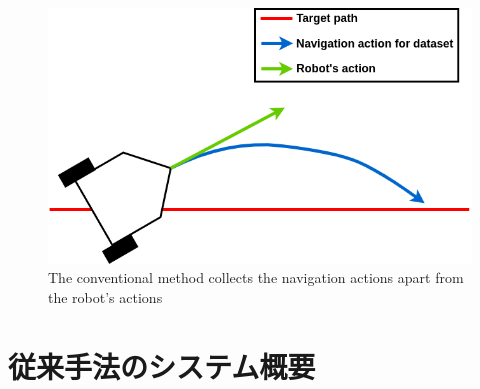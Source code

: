 \begin{figure}[h]
  \centering
  \includegraphics[keepaspectratio, scale=0.4]{images/old-method3.png}
  \caption{The conventional method collects the navigation actions apart from the robot's actions}
  \label{Fig:old-method3}
  \end{figure}

\newpage
\section{従来手法のシステム概要}

